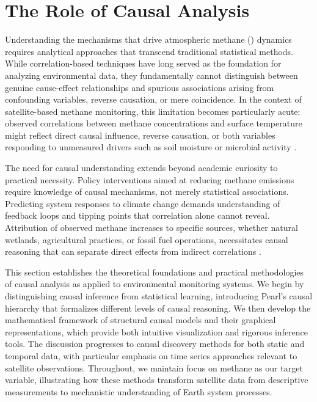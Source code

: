 \section{The Role of Causal Analysis}
\label{sec:causal_analysis}

Understanding the mechanisms that drive atmospheric methane () dynamics requires analytical approaches that transcend traditional statistical methods. While correlation-based techniques have long served as the foundation for analyzing environmental data, they fundamentally cannot distinguish between genuine cause-effect relationships and spurious associations arising from confounding variables, reverse causation, or mere coincidence. In the context of satellite-based methane monitoring, this limitation becomes particularly acute: observed correlations between methane concentrations and surface temperature might reflect direct causal influence, reverse causation, or both variables responding to unmeasured drivers such as soil moisture or microbial activity \cite{triacca_is_2005}.

The need for causal understanding extends beyond academic curiosity to practical necessity. Policy interventions aimed at reducing methane emissions require knowledge of causal mechanisms, not merely statistical associations. Predicting system responses to climate change demands understanding of feedback loops and tipping points that correlation alone cannot reveal. Attribution of observed methane increases to specific sources, whether natural wetlands, agricultural practices, or fossil fuel operations, necessitates causal reasoning that can separate direct effects from indirect correlations \cite{Saunois2020}.

This section establishes the theoretical foundations and practical methodologies of causal analysis as applied to environmental monitoring systems. We begin by distinguishing causal inference from statistical learning, introducing Pearl's causal hierarchy that formalizes different levels of causal reasoning. We then develop the mathematical framework of structural causal models and their graphical representations, which provide both intuitive visualization and rigorous inference tools. The discussion progresses to causal discovery methods for both static and temporal data, with particular emphasis on time series approaches relevant to satellite observations. Throughout, we maintain focus on methane as our target variable, illustrating how these methods transform satellite data from descriptive measurements to mechanistic understanding of Earth system processes.


